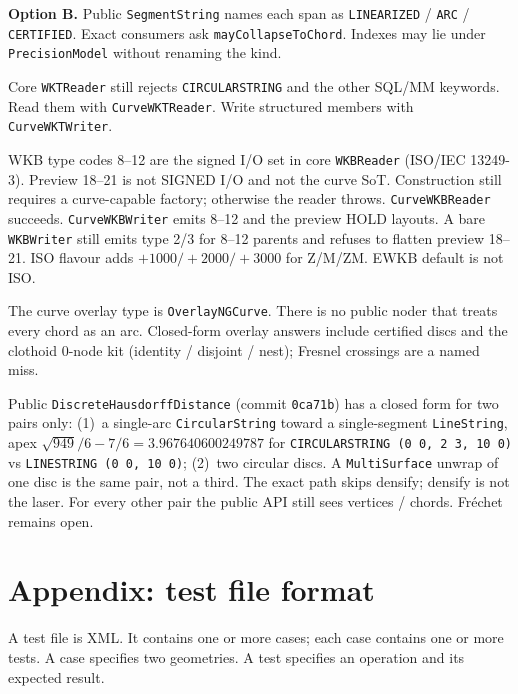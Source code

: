 \documentclass[11pt]{article}
\begin{document}
\textbf{Option B.} Public \texttt{SegmentString} names each span as
\texttt{LINEARIZED} / \texttt{ARC} / \texttt{CERTIFIED}. Exact
consumers ask \texttt{mayCollapseToChord}. Indexes may lie under
\texttt{PrecisionModel} without renaming the kind.

Core \texttt{WKTReader} still rejects \texttt{CIRCULARSTRING} and the
other SQL/MM keywords. Read them with \texttt{CurveWKTReader}. Write
structured members with \texttt{CurveWKTWriter}.

WKB type codes 8--12 are the signed I/O set in core
\texttt{WKBReader} (ISO/IEC 13249-3). Preview 18--21 is not SIGNED
I/O and not the curve SoT. Construction still requires a
curve-capable factory; otherwise the reader throws.
\texttt{CurveWKBReader} succeeds. \texttt{CurveWKBWriter} emits
8--12 and the preview HOLD layouts. A bare \texttt{WKBWriter} still
emits type 2/3 for 8--12 parents and refuses to flatten preview
18--21. ISO flavour adds $+1000/+2000/+3000$ for Z/M/ZM. EWKB
default is not ISO.

The curve overlay type is \texttt{OverlayNGCurve}. There is no public
noder that treats every chord as an arc. Closed-form overlay answers
include certified discs and the clothoid 0-node kit (identity /
disjoint / nest); Fresnel crossings are a named miss.

Public \texttt{DiscreteHausdorffDistance} (commit \texttt{0ca71b})
has a closed form for two pairs only: (1)~a single-arc
\texttt{CircularString} toward a single-segment \texttt{LineString},
apex $\sqrt{949}/6 - 7/6 = 3.967640600249787$ for
\texttt{CIRCULARSTRING (0 0, 2 3, 10 0)} vs
\texttt{LINESTRING (0 0, 10 0)}; (2)~two circular discs. A
\texttt{MultiSurface} unwrap of one disc is the same pair, not a
third. The exact path skips densify; densify is not the laser. For
every other pair the public API still sees vertices / chords.
Fr\'echet remains open.


\section{Appendix: test file format}
\label{sec:xml}
A test file is XML. It contains one or more cases; each case contains
one or more tests. A case specifies two geometries. A test specifies
an operation and its expected result.
\end{document}
